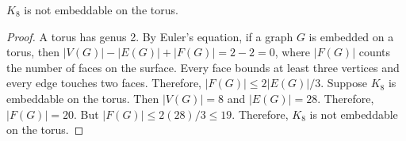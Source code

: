 \begin{proposition}
	$K_8$ is not embeddable on the torus.
\end{proposition}
\begin{proof}
	A torus has genus 2. By Euler's equation, if a graph $G$ is embedded on a torus, then $|V(G)| - |E(G)| + |F(G)| = 2 - 2 = 0$, where $|F(G)|$ counts the number of faces on the surface. Every face bounds at least three vertices and every edge touches two faces. Therefore, $|F(G)| \leq 2|E(G)|/3$. Suppose $K_8$ is embeddable on the torus. Then $|V(G)| = 8$ and $|E(G)| = 28$. Therefore, $|F(G)| = 20$. But $|F(G)| \leq 2 (28)/3 \leq 19$. Therefore, $K_8$ is not embeddable on the torus.
\end{proof}

